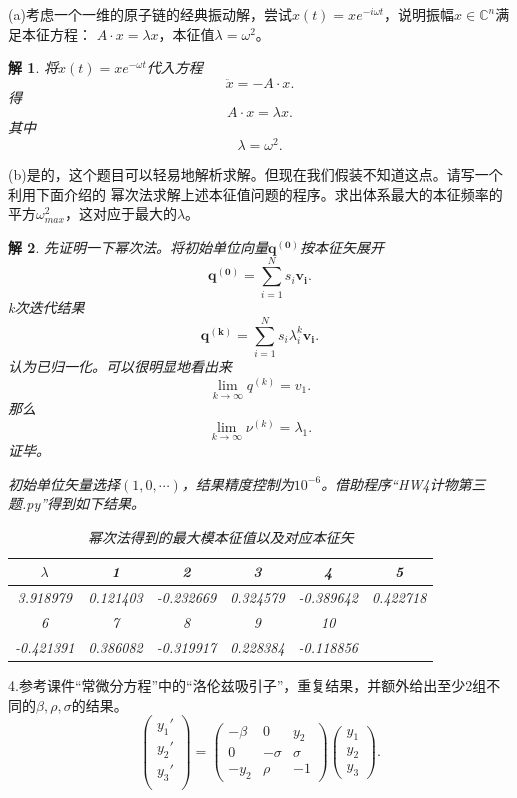 \documentclass[10pt]{ctexart}
\newtheorem*{solution}{解}
\begin{document}
(a)考虑一个一维的原子链的经典振动解，尝试$x(t)=xe^{-i\omega t}$，说明振幅$x\in\mathbb{C}^n$满足本征方程：
$A\cdot x=\lambda x$，本征值$\lambda=\omega^2$。
\begin{solution}
    将$x(t)=xe^{-\omega t}$代入方程
    $$\ddot{x}=-A\cdot x.$$
    得
    $$A\cdot x=\lambda x.$$
    其中
    $$\lambda=\omega^2.$$
\end{solution}
(b)是的，这个题目可以轻易地解析求解。但现在我们假装不知道这点。请写一个利用下面介绍的
幂次法求解上述本征值问题的程序。求出体系最大的本征频率的平方$\omega_{max}^2$，这对应于最大的$\lambda$。
\begin{solution}
    先证明一下幂次法。将初始单位向量$\bm{q^{(0)}}$按本征矢展开
    $$\bm{q^{(0)}}=\sum\limits_{i=1}^{N}s_i\bm{v_i}.$$
    k次迭代结果
    $$\bm{q^{(k)}}=\sum\limits_{i=1}^{N}s_i\lambda_i^k\bm{v_i}.$$
    认为已归一化。可以很明显地看出来
    $$\lim\limits_{k\rightarrow \infty}q^{(k)}=v_1.$$
    那么
    $$\lim\limits_{k\rightarrow \infty}\nu^{(k)}=\lambda_1.$$
    证毕。

    初始单位矢量选择$(1,0,\cdots)$，结果精度控制为$10^{-6}$。借助程序“HW4计物第三题.py”得到如下结果。
    \begin{table}[H]
        \centering
        \begin{tabular}{cccccc}
            \toprule
            $\lambda$ & 1 & 2 & 3 & 4 & 5\\
            \midrule
            3.918979 & 0.121403 & -0.232669 & 0.324579 & -0.389642 & 0.422718\\
            \bottomrule
            \toprule
            6 & 7 & 8 & 9 & 10\\
            \midrule
            -0.421391 & 0.386082 &-0.319917 & 0.228384 & -0.118856\\
            \bottomrule
        \end{tabular}
        \caption{幂次法得到的最大模本征值以及对应本征矢}
    \end{table}
\end{solution}
4.参考课件“常微分方程”中的“洛伦兹吸引子”，重复结果，并额外给出至少2组不同的$\beta,\rho,\sigma$的结果。
$$\begin{pmatrix}
    y_1'\\
    y_2'\\
    y_3'\\
\end{pmatrix}
=\begin{pmatrix}
    -\beta & 0 & y_2\\
    0 & -\sigma & \sigma \\
    -y_2 & \rho & -1 
\end{pmatrix}
\begin{pmatrix}
    y_1\\
    y_2\\
    y_3
\end{pmatrix}.$$
\end{document}
